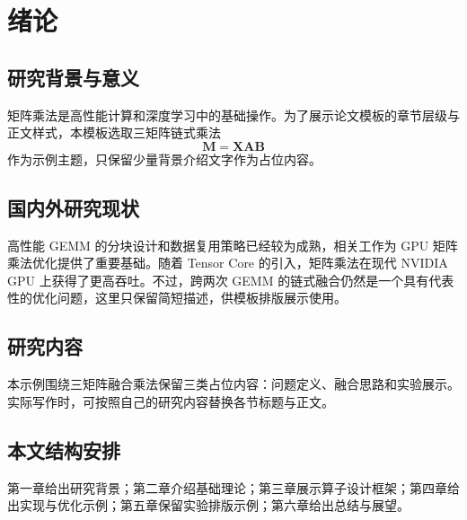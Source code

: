 \section{绪论}

\subsection{研究背景与意义}

矩阵乘法是高性能计算和深度学习中的基础操作。为了展示论文模板的章节层级与正文样式，本模板选取三矩阵链式乘法
\[
\mathbf{M} = \mathbf{X}\mathbf{A}\mathbf{B}
\]
作为示例主题，只保留少量背景介绍文字作为占位内容。

\subsection{国内外研究现状}

高性能 GEMM 的分块设计和数据复用策略已经较为成熟，相关工作为 GPU 矩阵乘法优化提供了重要基础\cite{goto2008anatomy}。随着 Tensor Core 的引入，矩阵乘法在现代 NVIDIA GPU 上获得了更高吞吐\cite{demystifying_tc}。不过，跨两次 GEMM 的链式融合仍然是一个具有代表性的优化问题，这里只保留简短描述，供模板排版展示使用。

\subsection{研究内容}

本示例围绕三矩阵融合乘法保留三类占位内容：问题定义、融合思路和实验展示。实际写作时，可按照自己的研究内容替换各节标题与正文。

\subsection{本文结构安排}

第一章给出研究背景；第二章介绍基础理论；第三章展示算子设计框架；第四章给出实现与优化示例；第五章保留实验排版示例；第六章给出总结与展望。
